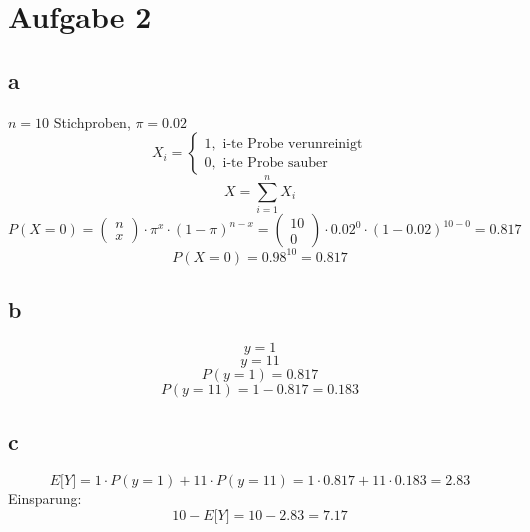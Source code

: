 
\section{Aufgabe 2}
\subsection{a}
$n = 10$ Stichproben, $\pi = 0.02$\\
\[ X_i = \left\lbrace \begin{array}{l}
1, \text{ i-te Probe verunreinigt}\\
0, \text{ i-te Probe sauber}\end{array} \right. \]
\[ X = \sum_{i=1}^{n} X_i \]
\[ P(X=0) = \left(\begin{matrix}n\\x\end{matrix}\right) \cdot 
\pi^x \cdot (1 - \pi)^{n-x} 
= \left(\begin{matrix}10\\0\end{matrix}\right) \cdot 0.02^0 \cdot 
(1 - 0.02)^{10-0} = 0.817 \]
\[ P(X=0) = 0.98^{10} = 0.817 \]

\subsection{b}
\[ y = 1 \]
\[ y = 11 \]
\[ P(y=1) = 0.817 \]
\[ P(y=11) = 1 - 0.817 = 0.183 \]

\subsection{c}
\[ E\lbrack Y \rbrack = 1 \cdot P(y=1) + 11 \cdot P(y=11) 
= 1 \cdot 0.817 + 11 \cdot 0.183 = 2.83 \]
Einsparung: 
\[ 10 - E\lbrack Y \rbrack = 10 - 2.83 = 7.17 \]